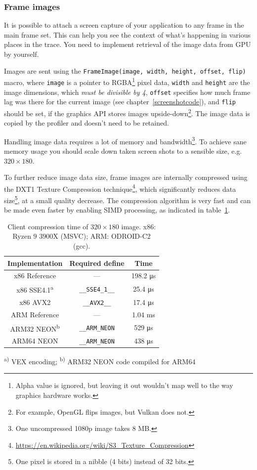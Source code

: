 \documentclass[hidelinks,titlepage,a4paper]{article}
\begin{document}
\subsubsection{Frame images}
\label{frameimages}

It is possible to attach a screen capture of your application to any frame in the main frame set. This can help you see the context of what's happening in various places in the trace. You need to implement retrieval of the image data from GPU by yourself.

Images are sent using the \texttt{FrameImage(image, width, height, offset, flip)} macro, where \texttt{image} is a pointer to RGBA\footnote{Alpha value is ignored, but leaving it out wouldn't map well to the way graphics hardware works.} pixel data, \texttt{width} and \texttt{height} are the image dimensions, which \emph{must be divisible by 4}, \texttt{offset} specifies how much frame lag was there for the current image (see chapter~\ref{screenshotcode}), and \texttt{flip} should be set, if the graphics API stores images upside-down\footnote{For example, OpenGL flips images, but Vulkan does not.}. The image data is copied by the profiler and doesn't need to be retained.

Handling image data requires a lot of memory and bandwidth\footnote{One uncompressed 1080p image takes 8 MB.}. To achieve sane memory usage you should scale down taken screen shots to a sensible size, e.g. $320\times180$.

To further reduce image data size, frame images are internally compressed using the DXT1 Texture Compression technique\footnote{\url{https://en.wikipedia.org/wiki/S3_Texture_Compression}}, which significantly reduces data size\footnote{One pixel is stored in a nibble (4 bits) instead of 32 bits.}, at a small quality decrease. The compression algorithm is very fast and can be made even faster by enabling SIMD processing, as indicated in table~\ref{EtcSimd}.

\begin{table}[h]
\centering
\begin{tabular}[h]{c|c|c}
\textbf{Implementation} & \textbf{Required define} & \textbf{Time} \\ \hline
x86 Reference & --- & 198.2 \si{\micro\second} \\
x86 SSE4.1\textsuperscript{a} & \texttt{\_\_SSE4\_1\_\_} & 25.4 \si{\micro\second} \\
x86 AVX2 & \texttt{\_\_AVX2\_\_} & 17.4 \si{\micro\second} \\
ARM Reference & --- & 1.04 \si{\milli\second} \\
ARM32 NEON\textsuperscript{b} & \texttt{\_\_ARM\_NEON} & 529 \si{\micro\second} \\
ARM64 NEON & \texttt{\_\_ARM\_NEON} & 438 \si{\micro\second}
\end{tabular}

\vspace{1em}
\textsuperscript{a)} VEX encoding; \hspace{0.5em} \textsuperscript{b)} ARM32 NEON code compiled for ARM64
\caption{Client compression time of $320\times180$ image. x86: Ryzen 9 3900X (MSVC); ARM: ODROID-C2 (gcc).}
\label{EtcSimd}
\end{table}
\end{document}

